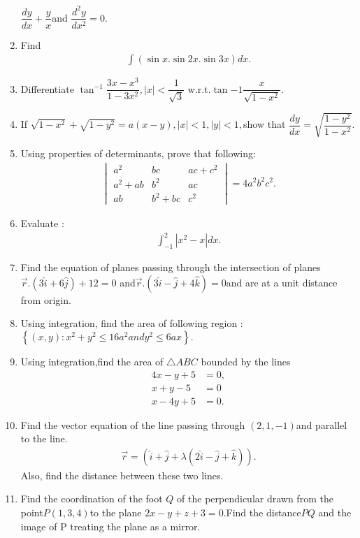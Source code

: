 \documentclass[12pt,-letter paper]{article}
\providecommand{\mydet}[1]{\ensuremath{\begin{vmatrix}#1\end{vmatrix}}}
\providecommand{\cbrak}[1]{\ensuremath{\left\{#1\right\}}}
\providecommand{\brak}[1]{\ensuremath{\left(#1\right)}}
\providecommand{\abs}[1]{\left\vert#1\right\vert}
\begin{document}
\begin{enumerate}
$\dfrac{dy}{dx}+\dfrac{y}{x}$and $\dfrac{d^2y}{dx^2}=0.$
\item Find 
\begin{align}
\int \brak{\sin x.\sin 2x.\sin3x}dx.
\end{align}
\item Differentiate $\tan^{-1}\dfrac{3x-x^3}{1-3x^2},|x|<\dfrac{1}{\sqrt{3}}$ w.r.t.$\tan{-1}\dfrac{x}{\sqrt{1-x^2}}.$
\item If $\sqrt{1-x^2}+\sqrt{1-y^2}=a\brak{x-y},\abs{x}<1,\abs{y}<1,$show that $\dfrac{dy}{dx}=\sqrt{\dfrac{1-y^2}{1-x^2}}.$
\item Using properties of determinants, prove that following:
\begin{align*}
    \mydet{a^2&bc&ac+c^2\\a^2+ab&b^2&ac\\ab&b^2+bc&c^2}=4a^2b^2c^2.
\end{align*}
\item Evaluate :
\begin{align}
\int_{-1}^{2}|x^2-x|dx.
\end{align}
\item Find the equation of planes passing through the intersection of planes$ \overrightarrow r.\brak{3\hat{i}+6\hat{j}}+12=0$ and$ \overrightarrow r.\brak{3\hat{i}-\hat{j}+4\hat{k}}=0 $and are at a unit distance from origin.
\item Using  integration, find the area of following region :$\cbrak{\brak{x,y}:x^2+y^2\leq16a^2 and y^2\leq6ax}.$
\item Using integration,find the area of $\triangle ABC$ bounded by the lines
\begin{align}
4x-y+5&=0,\\x+y-5&=0 \\ x-4y+5&=0.
\end{align}
\item Find the vector equation of the line passing through $\brak{2,1,-1}$and parallel to the line.
\begin{align} \overrightarrow r=\brak{\hat{i}+\hat{j}+\lambda \brak{2\hat{i}-\hat{j}+\hat{k}}}.\end{align} Also, find the distance between these two lines.
\item Find the coordination of the foot $Q$ of the perpendicular drawn from the point$ P \brak{1,3,4}$to the plane $2x-y+z+3=0$.Find the distance$ PQ$ and the  image of P treating the plane as a mirror.

\end{enumerate}
\end{document}
